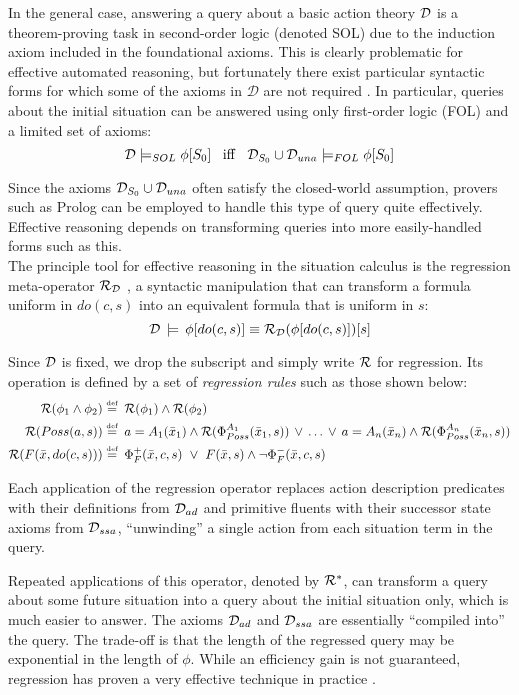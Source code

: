 In the general case, answering a query about a basic action theory
$\mathcal{D}$ is a theorem-proving task in second-order logic (denoted SOL)
due to the induction axiom included in the foundational axioms. This
is clearly problematic for effective automated reasoning, but fortunately
there exist particular syntactic forms for which some of the axioms
in $\mathcal{D}$ are not required \citet{pirri99contributions_sitcalc}.
In particular, queries about the initial situation can be answered
using only first-order logic (FOL) and a limited set of axioms:\[
\mathcal{D}\models_{SOL}\phi[S_{0}]\,\,\,\,\,\mathit{\mathrm{iff}}\,\,\,\,\,\mathcal{D}_{S_{0}}\cup\mathcal{D}_{una}\models_{FOL}\phi[S_{0}]\]


Since the axioms $\mathcal{D}_{S_{0}}\cup\mathcal{D}_{una}$ often satisfy the closed-world
assumption, provers such as Prolog can be employed to handle this
type of query quite effectively. Effective reasoning depends on transforming
queries into more easily-handled forms such as this. \\


The principle tool for effective reasoning in the situation calculus
is the regression meta-operator $\mathcal{R}_{\mathcal{D}}$ \citet{pirri99contributions_sitcalc},
a syntactic manipulation that can transform a formula uniform in $do(c,s)$
into an equivalent formula that is uniform in $s$:\[
\mathcal{D}\,\models\,\phi[do(c,s)]\equiv\mathcal{R}_{\mathcal{D}}(\phi[do(c,s)])[s]\]


Since $\mathcal{D}$ is fixed, we drop the subscript and simply write $\mathcal{R}$
for regression. Its operation is defined by a set of \emph{regression
rules} such as those shown below:\begin{align*}
\mathcal{R}(\phi_{1}\wedge\phi_{2})\stackrel{\mbox{\tiny def}}{=} & \,\,\,\mathcal{R}(\phi_{1})\wedge\mathcal{R}(\phi_{2})\\
\mathcal{R}(Poss(a,s))\stackrel{\mbox{\tiny def}}{=} & \,\,\, a=A{}_{1}(\bar{x}_{1})\wedge\mathcal{R}(\Phi_{Poss}^{A_{1}}(\bar{x}_{1},s))\,\vee\,\dots\,\vee\, a=A_{n}(\bar{x}_{n})\wedge\mathcal{R}(\Phi_{Poss}^{A_{n}}(\bar{x}_{n},s))\\
\mathcal{R}(F(\bar{x},do(c,s)))\stackrel{\mbox{\tiny def}}{=} & \,\,\,\Phi_{F}^{+}(\bar{x},c,s)\,\,\vee\,\, F(\bar{x},s)\wedge\neg\Phi_{F}^{-}(\bar{x},c,s)\end{align*}


Each application of the regression operator replaces action description
predicates with their definitions from $\mathcal{D}_{ad}$ and primitive fluents
with their successor state axioms from $\mathcal{D}_{ssa}$, {}``unwinding''
a single action from each situation term in the query.

Repeated applications of this operator, denoted by $\mathcal{R}^{*}$, can
transform a query about some future situation into a query about the
initial situation only, which is much easier to answer. The axioms
$\mathcal{D}_{ad}$ and $\mathcal{D}_{ssa}$ are essentially {}``compiled into''
the query. The trade-off is that the length of the regressed query
may be exponential in the length of $\phi$. While an efficiency gain
is not guaranteed, regression has proven a very effective technique
in practice \citet{levesque97golog,pirri99contributions_sitcalc}.

